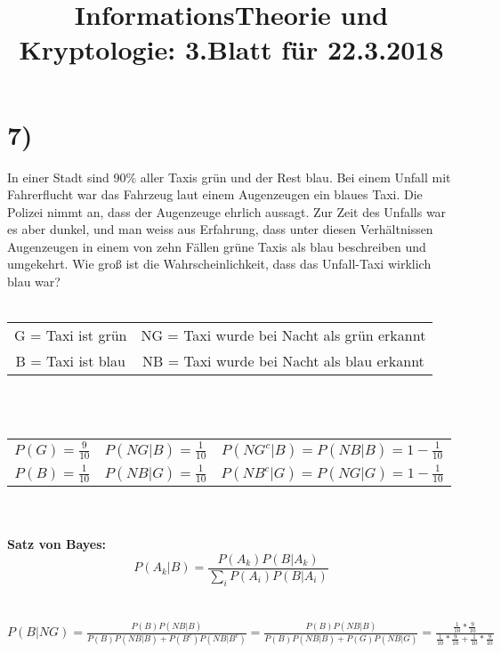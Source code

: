 \documentclass[11pt,a4paper]{article}
\author{}
\begin{document}
	\title{InformationsTheorie und Kryptologie: 3.Blatt für 22.3.2018}
	\maketitle

	
	\section*{7)}
	In einer Stadt sind 90\% aller Taxis grün und der Rest blau. Bei einem Unfall mit Fahrerflucht war das Fahrzeug laut einem Augenzeugen ein blaues Taxi. Die Polizei nimmt an, dass der Augenzeuge ehrlich aussagt. Zur Zeit des Unfalls war es aber dunkel, und man weiss aus Erfahrung, dass unter diesen Verhältnissen Augenzeugen in einem von zehn Fällen grüne Taxis als blau beschreiben und umgekehrt. Wie groß ist die Wahrscheinlichkeit, dass das Unfall-Taxi wirklich blau war?\\
	\\
	\begin{tabular}{cc}		 
		G = Taxi ist grün & NG = Taxi wurde bei Nacht als grün erkannt \\ 		 
		B = Taxi ist blau & NB = Taxi wurde bei Nacht als blau erkannt \\ 		 
	\end{tabular} \\
	\\
	\begin{tabular}{c|c|c}		 
		\(P(G) = \frac{9}{10}\) & \(P(NG|B) = \frac{1}{10}\) & \(P(NG^c|B) = P(NB|B) = 1 - \frac{1}{10}\) \\ 		 
		\(P(B) = \frac{1}{10}\) & \(P(NB|G) = \frac{1}{10}\) & \(P(NB^c|G) = P(NG|G) = 1 - \frac{1}{10}\) \\ 		 
	\end{tabular} \\
	\\
	\textbf{Satz von Bayes:}\\
	\[P(A_k|B) = \frac{P(A_k)P(B|A_k)}{\sum_{i}^{}P(A_i)P(B|A_i)}\]\\
	\\
	\(P(B|NG) = \frac{P(B)P(NB|B)}{P(B)P(NB|B) + P(B^c)P(NB|B^c)} = \frac{P(B)P(NB|B)}{P(B)P(NB|B) + P(G)P(NB|G)} = \frac{\frac{1}{10}*\frac{9}{10}}{\frac{1}{10}*\frac{9}{10} + \frac{1}{10}*\frac{9}{10}} \) \\
	
	\newpage
\end{document}
